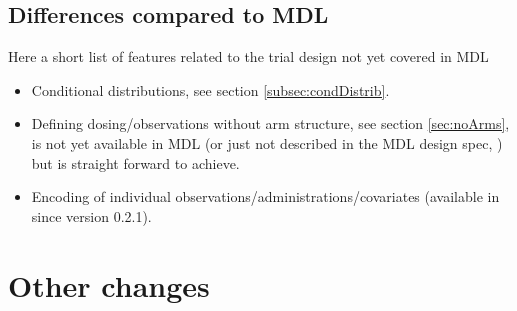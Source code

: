 \section{Differences compared to MDL}
Here a short list of features related to the trial design not yet covered in MDL
\begin{itemize}	
\item 
Conditional distributions, see section \ref{subsec:condDistrib}.
\item 
Defining dosing/observations without arm structure, see section \ref{sec:noArms},
is not yet available in MDL (or just not described in the MDL design spec,
\cite{Commets2015} ) but is straight forward to achieve.
\item 
Encoding of individual observations/administrations/covariates (available in \pml since 
version 0.2.1).\
\end{itemize}




%
%

\chapter{Other changes}
\label{ch:otherChanges}

